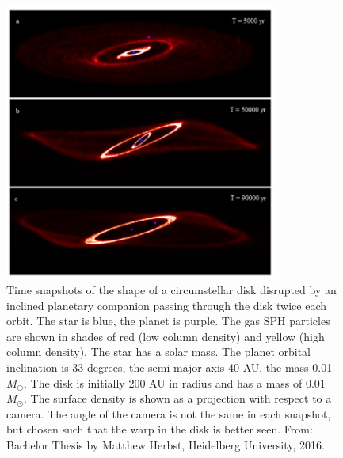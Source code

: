 \documentclass[10pt,fleqn,twoside]{article}
\begin{document}
\begin{figure}
\centerline{\includegraphics[width=0.8\textwidth]{D2Fig/Herbst_Fig6-eps-converted-to.pdf}}
\caption{\label{fig-herbst-6}Time snapshots of the shape of a circumstellar
  disk disrupted by an inclined planetary companion passing through the disk
  twice each orbit. The star is blue, the planet is purple. The gas SPH
  particles are shown in shades of red (low column density) and yellow (high
  column density). The star has a solar mass. The planet orbital inclination
  is 33 degrees, the semi-major axis 40 AU, the mass 0.01 $M_{\odot}$. The
  disk is initially 200 AU in radius and has a mass of 0.01 $M_{\odot}$. The
  surface density is shown as a projection with respect to a camera. The
  angle of the camera is not the same in each snapshot, but chosen such that
  the warp in the disk is better seen. From: Bachelor Thesis by Matthew
  Herbst, Heidelberg University, 2016.}
\end{figure}
\end{document}
